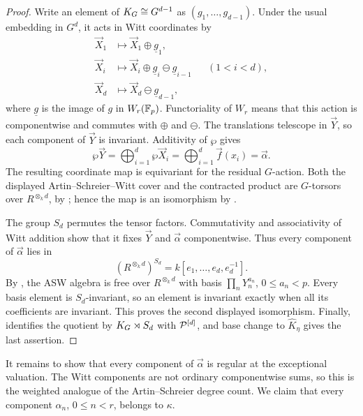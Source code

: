 \begin{proof}
Write an element of $K_{G}\cong G^{d-1}$ as
$(g_1,\dots,g_{d-1})$. Under the usual embedding in $G^d$, it acts in Witt
coordinates by
\[
\begin{aligned}
    \vec X_1&\longmapsto\vec X_1\oplus\underline g_1,\\
    \vec X_i&\longmapsto
       \vec X_i\oplus\underline g_i\ominus\underline g_{i-1}
       &&(1<i<d),\\
    \vec X_d&\longmapsto\vec X_d\ominus\underline g_{d-1},
\end{aligned}
\]
where $\underline g$ is the image of $g$ in $W_r(\mathbb{F}_p)$. Functoriality of
$W_r$ means that this action is componentwise and commutes with $\oplus$ and
$\ominus$. The translations telescope in $\vec Y$, so each component of
$\vec Y$ is invariant. Additivity of $\wp$ gives
\[
    \wp\vec Y
       =\bigoplus_{i=1}^d\wp\vec X_i
       =\bigoplus_{i=1}^d\vec f(x_i)
       =\vec\alpha.
\]
The resulting coordinate map is equivariant for the residual $G$-action.
Both the displayed Artin--Schreier--Witt cover and the contracted product are
$G$-torsors over $R^{\otimes_k d}$, by
; hence the
map is an isomorphism by .

The group $S_d$ permutes the tensor factors. Commutativity and associativity
of Witt addition show that it fixes $\vec Y$ and $\vec\alpha$ componentwise.
Thus every component of $\vec\alpha$ lies in
\[
    (R^{\otimes_k d})^{S_d}=k[e_1,\dots,e_d,e_d^{-1}].
\]
By , the ASW algebra is free over
$R^{\otimes_k d}$ with basis
$\prod_nY_n^{a_n}$, $0\leq a_n<p$. Every basis element is $S_d$-invariant,
so an element is invariant exactly when all its coefficients are invariant.
This proves the second displayed isomorphism. Finally,
 identifies the quotient by
$K_{G}\rtimes S_d$ with $\mathcal{P}^{[d]}$, and base change to $\widehat K_\eta$
gives the last assertion.
\end{proof}

It remains to show that every component of $\vec\alpha$ is regular at the
exceptional valuation. The Witt components are not ordinary componentwise
sums, so this is the weighted analogue of the Artin--Schreier degree count.
We claim that every component $\alpha_n$, $0\leq n<r$, belongs to $\kappa$.

